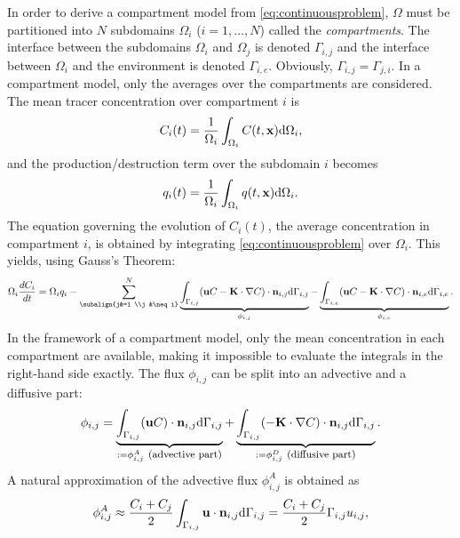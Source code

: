 In order to derive a compartment model from \eqref{eq:continuousproblem}, $\Omega$ must be partitioned into $N$ subdomains $\Omega_i$ ($i = 1,\dots,N$) called the \textit{compartments}. The interface between the subdomains $\Omega_i$ and $\Omega_j$ is denoted $\Gamma_{i,j}$ and the interface between $\Omega_i$ and the environment is denoted $\Gamma_{i,e}$. Obviously, $\Gamma_{i,j} = \Gamma_{j,i}$. In a compartment model, only the averages over the compartments are considered. The mean tracer concentration over compartment $i$ is 
\begin{equation} \label{eq:C_i(t)}
	C_i(t) = \frac{1}{\Omega_i} \int_{\Omega_i} C(t,\mathbf x) \mathrm d\Omega_i,
\end{equation}
and the production/destruction term over the subdomain $i$ becomes
\begin{equation}
	q_i(t) =  \frac{1}{\Omega_i} \int_{\Omega_i} q(t,\mathbf x) \mathrm d\Omega_i.
\end{equation}
The equation governing the evolution of $C_i(t)$, the average concentration in compartment $i$, is obtained by integrating \eqref{eq:continuousproblem} over $\Omega_i$. This yields, using Gauss's Theorem:
\begin{equation}
	\Omega_i \frac{d C_i}{d t} = \Omega_i q_i - \sum_{\subalign{j&=1 \\j &\neq i}}^N \underbrace{\int_{\Gamma_{i,j}} (\b u C - \b K \cdot \nabla C)\cdot \b n_{i,j} \rm d\Gamma_{i,j}}_{\phi_{i,j}} - \underbrace{\int_{\Gamma_{i,e}} (\b u C - \b K \cdot \nabla C)\cdot \b n_{i,e} \rm d\Gamma_{i,e}}_{\phi_{i,e}}.
\end{equation}
In the framework of a compartment model, only the mean concentration in each compartment are available, making it impossible to evaluate the integrals in the right-hand side exactly. The flux $\phi_{i,j}$ can be split into an advective and a diffusive part:
\begin{equation} \label{eq:phi_i,j}
	\phi_{i,j} = \underbrace{\int_{\Gamma_{i,j}} (\mathbf u C)\cdot \mathbf n_{i,j} \mathrm d\Gamma_{i,j}}_{:= \phi_{i,j}^A \mbox{ \footnotesize (advective part)}} + \underbrace{\int_{\Gamma_{i,j}} (-\mathbf K \cdot \nabla C)\cdot \mathbf n_{i,j} \mathrm d\Gamma_{i,j}}_{:= \phi_{i,j}^D \mbox{ \footnotesize (diffusive part)}}.
\end{equation} 
A natural approximation of the advective flux $\phi_{i,j}^A$ is obtained as
\begin{equation}
	\phi_{i,j}^A \approx \frac{C_i + C_j}{2} \int_{\Gamma_{i,j}} \mathbf u \cdot \mathbf n_{i,j} \mathrm d\Gamma_{i,j} =  \frac{C_i + C_j}{2} \Gamma_{i,j} u_{i,j},
\end{equation}
